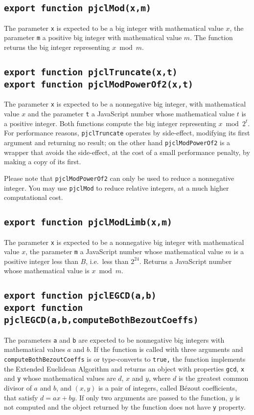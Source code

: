 \documentclass[12pt]{article}
\begin{document}
\subsection{\tt export function pjclMod(x,m)}

The parameter {\tt x} is expected to be a big integer with
mathematical value $x$, the parameter {\tt m} a positive big integer
with mathematical value $m$.  The function returns the big integer
representing $x \bmod m$.

\subsection{\tt export function pjclTruncate(x,t)\\export function pjclModPowerOf2(x,t)}

The parameter {\tt x} is expected to be a nonnegative big integer,
with mathematical value $x$ and the parameter {\tt t} 
a JavaScript number whose mathematical value $t$ is a positive
integer.  Both functions compute the big integer representing $x \bmod
2^t$.  For performance reasons, {\tt pjclTruncate} operates by side-effect, modifying its first argument and returning no result; on the other hand {\tt pjclModPowerOf2} is a wrapper that avoids the side-effect, at the cost of a small performance penalty, by making a copy of its first.

Please note that {\tt pjclModPowerOf2} can only be used to reduce a nonnegative integer.  You may use {\tt pjclMod} to reduce relative integers, at a much higher computational cost.

\subsection{\tt export function pjclModLimb(x,m)}

The parameter {\tt x} is expected to be a nonnegative big integer with
mathematical value $x$, the parameter {\tt m} a JavaScript number
whose mathematical value $m$ is a positive integer less than $B$, i.e.\ less than $2^{24}$.  Returns a
JavaScript number whose mathematical value is $x \bmod m$.

\subsection{\tt export function pjclEGCD(a,b)\\export function pjclEGCD(a,b,computeBothBezoutCoeffs)}

The parameters {\tt a} and {\tt b} are expected to be nonnegative big
integers with mathematical values $a$ and $b$.  If the function is
called with three arguments and {\tt computeBothBezoutCoeffs} is or
type-converts to {\tt true,} the function implements the Extended
Euclidean Algorithm and returns an object with properties {\tt gcd},
{\tt x} and {\tt y} whose mathematical values are $d$, $x$
and $y$, where $d$ is the greatest common divisor of $a$ and $b$, and
$(x,y)$ is a pair of integers, called B\'ezout coefficients, that
satisfy $d = ax + by$.  If only two arguments are passed to the
function, $y$ is not computed and the object returned by the function
does not have {\tt y} property.
\end{document}
